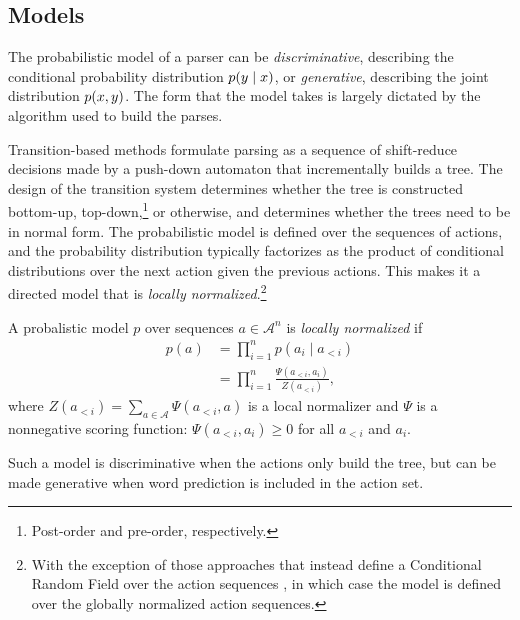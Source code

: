   \subsection{Models}
    The probabilistic model of a parser can be \textit{discriminative}, describing the conditional probability distribution $p(y \mid x)$, or \textit{generative}, describing the joint distribution $p(x, y)$. The form that the model takes is largely dictated by the algorithm used to build the parses.

    Transition-based methods formulate parsing as a sequence of shift-reduce decisions made by a push-down automaton that incrementally builds a tree. The design of the transition system determines whether the tree is constructed bottom-up, top-down,\footnote{Post-order and pre-order, respectively.} or otherwise, and determines whether the trees need to be in normal form. The probabilistic model is defined over the sequences of actions, and the probability distribution typically factorizes as the product of conditional distributions over the next action given the previous actions. This makes it a directed model that is \textit{locally normalized}.\footnote{With the exception of those approaches that instead define a Conditional Random Field over the action sequences \citep{andor2016globally}, in which case the model is defined over the globally normalized action sequences.}
    \begin{definition}{}
      A probalistic model $p$ over sequences $a \in \mathcal{A}^n$ is \textit{locally normalized} if
      \begin{align*}
        p(a)
          &= \prod_{i=1}^{n} p(a_i \mid a_{<i})  \\
          &= \prod_{i=1}^{n} \frac{ \Psi( a_{<i}, a_{i} ) }{ Z( a_{<i} ) },
      \end{align*}
      where $Z( a_{<i} ) = \sum_{a \in \mathcal{A}} \Psi( a_{<i}, a )$  is a local normalizer and $\Psi$ is a nonnegative scoring function: $\Psi( a_{<i}, a_{i} ) \geq 0$ for all $a_{<i}$ and $a_i$.
    \end{definition}
    Such a model is discriminative when the actions only build the tree, but can be made generative when word prediction is included in the action set.

